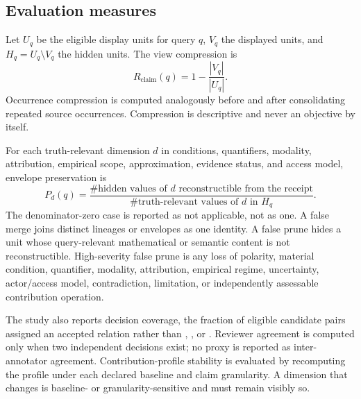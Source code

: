 \subsection{Evaluation measures}

Let $U_q$ be the eligible display units for query $q$, $V_q$ the displayed units, and $H_q=U_q\setminus V_q$ the hidden units. The view compression is
\begin{equation}
R_{\mathrm{claim}}(q)=1-\frac{|V_q|}{|U_q|}.
\end{equation}
Occurrence compression is computed analogously before and after consolidating repeated source occurrences. Compression is descriptive and never an objective by itself.

For each truth-relevant dimension $d$ in conditions, quantifiers, modality, attribution, empirical scope, approximation, evidence status, and access model, envelope preservation is
\begin{equation}
P_d(q)=\frac{\#\text{hidden values of }d\text{ reconstructible from the receipt}}{\#\text{truth-relevant values of }d\text{ in }H_q}.
\end{equation}
The denominator-zero case is reported as not applicable, not as one. A false merge joins distinct lineages or envelopes as one identity. A false prune hides a unit whose query-relevant mathematical or semantic content is not reconstructible. High-severity false prune is any loss of polarity, material condition, quantifier, modality, attribution, empirical regime, uncertainty, actor/access model, contradiction, limitation, or independently assessable contribution operation.

The study also reports decision coverage, the fraction of eligible candidate pairs assigned an accepted relation rather than , , or . Reviewer agreement is computed only when two independent decisions exist; no proxy is reported as inter-annotator agreement. Contribution-profile stability is evaluated by recomputing the profile under each declared baseline and claim granularity. A dimension that changes is baseline- or granularity-sensitive and must remain visibly so.